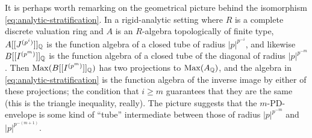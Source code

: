 \documentclass{article}
\theoremstyle{change}
\numberwithin{equation}{subsubsection}
\begin{document}
It is perhaps worth remarking on the geometrical picture behind the
isomorphism \ref{eq:analytic-stratification}. In a rigid-analytic
setting where $R$ is a complete discrete valuation ring and $A$ is an
$R$-algebra topologically of finite type, $A[[{J}^{({p^i})}]]_{\mathbb Q}$ is
the function algebra of a closed tube of radius $|p|^{p^{-i}}$, and
likewise $B[[{I}^{({p^m})}]]_{\mathbb Q}$ is the function algebra of a
closed tube of the diagonal of radius $|p|^{p^{-m}}$. Then
${\operatorname{Max}}(B[[{I}^{({p^m})}]]_{\mathbb Q})$ has two projections to
${\operatorname{Max}}(A_{\mathbb Q})$, and the algebra in \ref{eq:analytic-stratification} is
the function algebra of the inverse image by either of these
projections; the condition that $i\ge m$ guarantees that they are the
same (this is the triangle inequality, really). The picture suggests
that the $m$-PD-envelope is some kind of ``tube'' intermediate between
those of radius $|p|^{p^{-m}}$ and $|p|^{p^{-(m+1)}}$.
\end{document}
